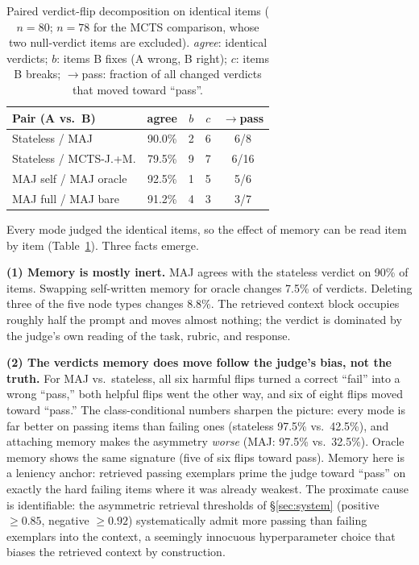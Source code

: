 \documentclass[11pt]{article}
\begin{document}
\begin{table}[t]
\centering
\small
\begin{tabular}{lcccc}
\toprule
Pair (A vs.\ B) & agree & $b$ & $c$ & $\to$pass \\
\midrule
Stateless / MAJ & 90.0\% & 2 & 6 & 6/8 \\
Stateless / MCTS-J.+M. & 79.5\% & 9 & 7 & 6/16 \\
MAJ self / MAJ oracle & 92.5\% & 1 & 5 & 5/6 \\
MAJ full / MAJ bare & 91.2\% & 4 & 3 & 3/7 \\
\bottomrule
\end{tabular}
\caption{Paired verdict-flip decomposition on identical items ($n{=}80$; $n{=}78$ for the MCTS comparison, whose two null-verdict items are excluded). \emph{agree}: identical verdicts; $b$: items B fixes (A wrong, B right); $c$: items B breaks; $\to$pass: fraction of all changed verdicts that moved toward ``pass''.}
\label{tab:flips}
\end{table}

Every mode judged the identical items, so the effect of memory can be read item by item (Table~\ref{tab:flips}). Three facts emerge.

\textbf{(1) Memory is mostly inert.} MAJ agrees with the stateless verdict on 90\% of items. Swapping self-written memory for oracle changes 7.5\% of verdicts. Deleting three of the five node types changes 8.8\%. The retrieved context block occupies roughly half the prompt and moves almost nothing; the verdict is dominated by the judge's own reading of the task, rubric, and response.

\textbf{(2) The verdicts memory does move follow the judge's bias, not the truth.} For MAJ vs.\ stateless, all six harmful flips turned a correct ``fail'' into a wrong ``pass,'' both helpful flips went the other way, and six of eight flips moved toward ``pass.'' The class-conditional numbers sharpen the picture: every mode is far better on passing items than failing ones (stateless 97.5\% vs.\ 42.5\%), and attaching memory makes the asymmetry \emph{worse} (MAJ: 97.5\% vs.\ 32.5\%). Oracle memory shows the same signature (five of six flips toward pass). Memory here is a leniency anchor: retrieved passing exemplars prime the judge toward ``pass'' on exactly the hard failing items where it was already weakest. The proximate cause is identifiable: the asymmetric retrieval thresholds of \S\ref{sec:system} (positive $\ge 0.85$, negative $\ge 0.92$) systematically admit more passing than failing exemplars into the context, a seemingly innocuous hyperparameter choice that biases the retrieved context by construction.
\end{document}
